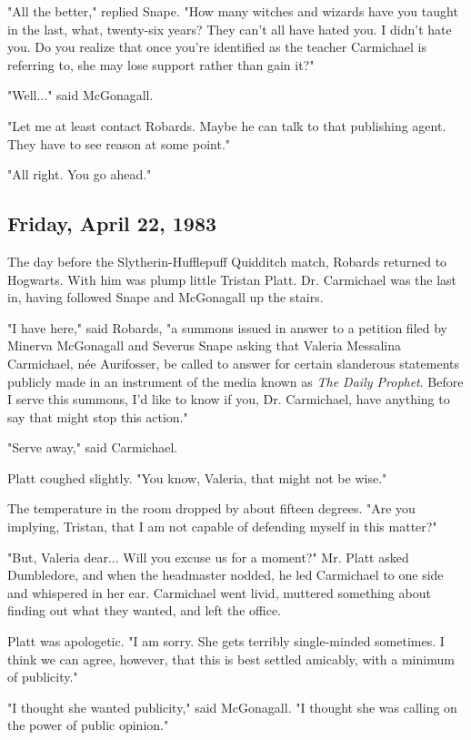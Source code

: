 \documentclass[a4paper,11pt]{article}
\begin{document}
"All the better," replied Snape. "How many witches and wizards have you taught in the last, what, twenty-six years? They can't all have hated you. I didn't hate you. Do you realize that once you're identified as the teacher Carmichael is referring to, she may lose support rather than gain it?"

"Well..." said McGonagall.

"Let me at least contact Robards. Maybe he can talk to that publishing agent. They have to see reason at some point."

"All right. You go ahead."

\subsection{Friday, April 22, 1983}

The day before the Slytherin-Hufflepuff Quidditch match, Robards returned to Hogwarts. With him was plump little Tristan Platt. Dr. Carmichael was the last in, having followed Snape and McGonagall up the stairs.

"I have here," said Robards, "a summons issued in answer to a petition filed by Minerva McGonagall and Severus Snape asking that Valeria Messalina Carmichael, née Aurifosser, be called to answer for certain slanderous statements publicly made in an instrument of the media known as \emph{The Daily Prophet}. Before I serve this summons, I'd like to know if you, Dr. Carmichael, have anything to say that might stop this action."

"Serve away," said Carmichael.

Platt coughed slightly. "You know, Valeria, that might not be wise."

The temperature in the room dropped by about fifteen degrees. "Are you implying, Tristan, that I am not capable of defending myself in this matter?"

"But, Valeria dear... Will you excuse us for a moment?" Mr. Platt asked Dumbledore, and when the headmaster nodded, he led Carmichael to one side and whispered in her ear. Carmichael went livid, muttered something about finding out what they wanted, and left the office.

Platt was apologetic. "I am sorry. She gets terribly single-minded sometimes. I think we can agree, however, that this is best settled amicably, with a minimum of publicity."

"I thought she wanted publicity," said McGonagall. "I thought she was calling on the power of public opinion."
\end{document}
